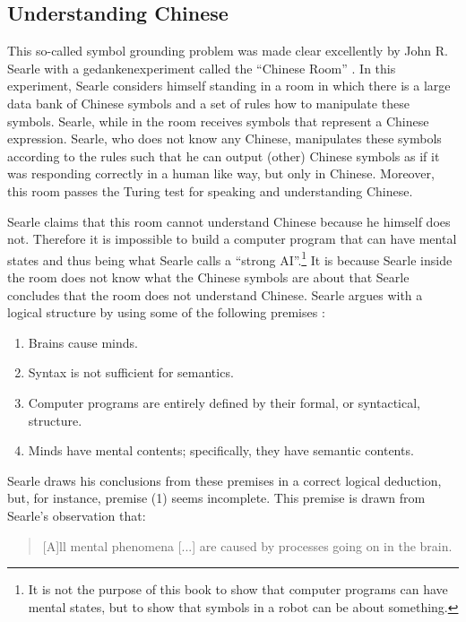 \subsection{Understanding Chinese}This so-called symbol grounding problem was made clear excellently by John R. Searle with a gedankenexperiment called the ``Chinese Room'' \citep{searle:1980}. In this experiment, Searle considers himself standing in a room in which there is a large data bank of Chinese symbols and a set of rules how to manipulate these symbols. Searle, while in the room receives symbols that represent a Chinese expression. Searle, who does not know any Chinese, manipulates these symbols according to the rules such that he can output (other) Chinese symbols as if it was responding correctly in a human like way, but only in Chinese. Moreover, this room passes the Turing test for speaking and understanding Chinese.

Searle claims that this room cannot understand Chinese because he himself does not. Therefore it is impossible to build a computer program that can have mental states and thus being what Searle calls a ``strong AI''.\footnote{It is not the purpose of this book to show that computer programs can have mental states, but to show that symbols in a robot can be about something.} It is because Searle inside the room does not know what the Chinese symbols are about that Searle concludes that the room does not understand Chinese. Searle argues with a logical structure by using some of the following premises \citep[39]{searle:1984}:

\begin{enumerate}[label=(\arabic*)]
\item Brains cause minds.
\item Syntax is not sufficient for semantics.
\item Computer programs are entirely defined by their formal, or syntactical, structure.
\item Minds have mental contents; specifically, they have semantic contents.
\end{enumerate}

Searle draws his conclusions from these premises in a correct logical deduction, but, for instance, premise (1) seems incomplete. This premise is drawn from Searle's observation that:

\begin{quote}
[A]ll mental phenomena [...] are caused by processes going on in the brain. \citep[18]{searle:1984}
\end{quote}

